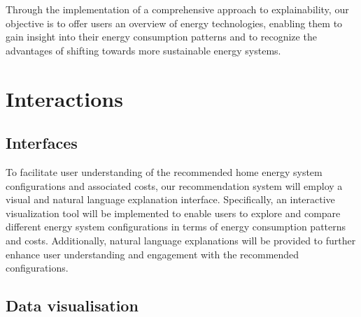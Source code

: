 Through the implementation of a comprehensive approach to explainability, our objective is to offer users an overview of energy technologies, enabling them to gain insight into their energy consumption patterns and to recognize the advantages of shifting towards more sustainable energy systems.

\section{Interactions}

\subsection{Interfaces}

To facilitate user understanding of the recommended home energy system configurations and associated costs, our recommendation system will employ a visual and natural language explanation interface. 
Specifically, an interactive visualization tool will be implemented to enable users to explore and compare different energy system configurations in terms of energy consumption patterns and costs. 
Additionally, natural language explanations will be provided to further enhance user understanding and engagement with the recommended configurations. 


\subsection{Data visualisation}


